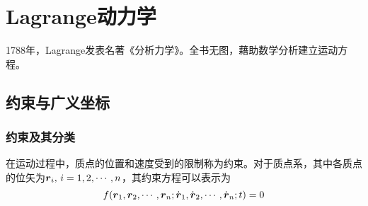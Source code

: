 \chapter{Lagrange动力学}

1788年，Lagrange发表名著《分析力学》。全书无图，藉助数学分析建立运动方程。

\section{约束与广义坐标}

\subsection{约束及其分类}

在运动过程中，质点的位置和速度受到的限制称为{\heiti 约束}。对于质点系，其中各质点的位矢为$\boldsymbol{r}_i,\,i=1,2,\cdots,n$，其约束方程可以表示为
\begin{equation}
	f(\boldsymbol{r}_1,\boldsymbol{r}_2,\cdots,\boldsymbol{r}_n;\dot{\boldsymbol{r}}_1,\dot{\boldsymbol{r}}_2,\cdots,\dot{\boldsymbol{r}}_n;t) = 0
	\label{约束方程}
\end{equation}

